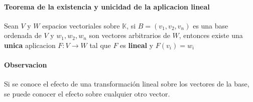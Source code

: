 \documentclass[10pt]{article}
\begin{document}
\paragraph{Teorema de la existencia y unicidad de la aplicacion lineal}

Sean $V$ y $W$ espacios vectoriales sobre $\mathbb{K}$, si $B = (v_1, v_2, v_n)$ es una base ordenada de $V$ y $w_1, w_2, w_n$ son vectores arbitrarios de $W$, entonces existe una \textbf{unica} aplicacion $F: V \rightarrow W$ tal que $F$ es \textbf{lineal} y $F(v_i) = w_i$
\paragraph{Observacion} Si se conoce el efecto de una transformación lineal sobre los vectores de la base, se puede conocer el efecto sobre cualquier otro vector.
 
\end{document}
